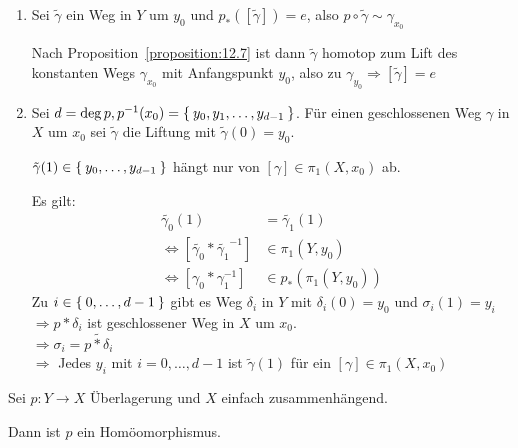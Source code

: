 \begin{beweis}\leavevmode
    \begin{enumerate}[label=\alph*)]
        \item Sei $\tilde{\gamma}$ ein Weg in $Y$ um $y_0$ und
              $p_* ([\tilde{\gamma}]) = e$, also $p \circ \tilde{\gamma} \sim \gamma_{x_0}$

              Nach Proposition~\ref{proposition:12.7} ist dann 
              $\tilde{\gamma}$ homotop zum Lift des konstanten Wegs
              $\gamma_{x_0}$ mit Anfangspunkt $y_0$, also zu
              $\gamma_{y_0} \Rightarrow [\tilde{\gamma}] = e$
        \item Sei $d = \deg{p}, p^{-1}(x_0) = \Set{y_0, y_1, \dots, y_{d-1}}$.
              Für einen geschlossenen Weg $\gamma$ in $X$ um $x_0$
              sei $\tilde{\gamma}$ die Liftung mit $\tilde{\gamma}(0) = y_0$.

              $\tilde{\gamma}(1) \in \Set{y_0, \dots, y_{d-1}}$ hängt
              nur von $[\gamma] \in \pi_1(X,x_0)$ ab.

              Es gilt:
              \begin{align*}
                \tilde{\gamma_0}(1) &= \tilde{\gamma_1}(1)\\
                \Leftrightarrow [\tilde{\gamma_0} * \tilde{\gamma_1}^{-1}] &\in \pi_1(Y, y_0)\\
                \Leftrightarrow [\gamma_0 * \gamma_1^{-1}] &\in p_* (\pi_1(Y,y_0))
              \end{align*}
              Zu $i \in \Set{0, \dots, d-1}$ gibt es Weg $\delta_i$ in
              $Y$ mit $\delta_i(0) = y_0$ und $\sigma_i(1) = y_i$\\
              $\Rightarrow p * \delta_i$ ist geschlossener Weg in 
              $X$ um $x_0$.\\
              $\Rightarrow \sigma_i = \widetilde{p*\delta_i}$\\
              $\Rightarrow$ Jedes $y_i$ mit $i=0, \dots, d-1$ ist 
              $\tilde{\gamma}(1)$ für ein $[\gamma] \in \pi_1(X,x_0)$
    \end{enumerate}
\end{beweis}

\begin{korollar}%
    Sei $p: Y \rightarrow X$ Überlagerung und $X$ einfach zusammenhängend.

    Dann ist $p$ ein Homöomorphismus.
\end{korollar}

